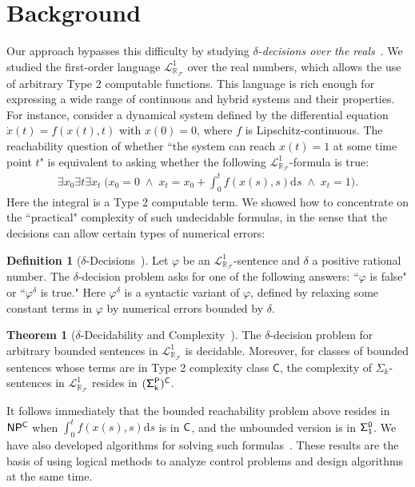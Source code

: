 \documentclass[10pt]{article}
\newcommand{\lrf}{\mathcal{L}_{\mathbb{R}_{\mathcal{F}}}}
\theoremstyle{definition}
\newtheorem{definition}{Definition}
\newtheorem{theorem}{Theorem}
\begin{document}
\section{Background}

Our approach bypasses this difficulty by studying {\em $\delta$-decisions over the reals}~\cite{DBLP:conf/lics/GaoAC12}. We studied the first-order language $\lrf^1$ over the real numbers, which allows the use of arbitrary Type 2 computable functions. This language is rich enough for expressing a wide range of continuous and hybrid systems and their properties. For instance, consider a dynamical system defined by the differential equation $\dot{x}(t) = f(x(t),t)$ with $x(0)= 0$, where $f$ is Lipschitz-continuous. The reachability question of whether ``the system can reach $x(t)=1$ at some time point $t$" is equivalent to asking whether the following $\mathcal{L}^1_{\mathbb{R}_{\mathcal{F}}}$-formula is true:
\begin{eqnarray*}\exists x_0 \exists t \exists x_t\; \bigg(x_0 = 0 \;\wedge\; x_t = x_0 + \int_{0}^t f(x(s),s)\mathrm{d}s\; \wedge\; x_t = 1\bigg).\end{eqnarray*}
Here the integral is a Type 2 computable term. We showed how to concentrate on the ``practical" complexity of such undecidable formulas, in the sense that the decisions can allow certain types of numerical errors:
\begin{definition}[$\delta$-Decisions~\cite{DBLP:conf/lics/GaoAC12}] Let $\varphi$ be an $\lrf^1$-sentence and $\delta$ a positive rational number. The $\delta$-decision problem asks for one of the following answers: ``$\varphi$ is false" or ``$\varphi^{\delta}$ is true." Here $\varphi^{\delta}$ is a syntactic variant of $\varphi$, defined by relaxing some constant terms in $\varphi$ by numerical errors bounded by $\delta$. 
\end{definition}
\begin{theorem}[$\delta$-Decidability and Complexity~\cite{DBLP:conf/lics/GaoAC12}] The $\delta$-decision problem for arbitrary bounded sentences in $\lrf^1$ is decidable. Moreover, for classes of bounded sentences whose terms are in Type 2 complexity class $\mathsf{C}$, the complexity of $\Sigma_k$-sentences in $\lrf^1$ resides in ${\sf (\Sigma^P_k)^C}$. 
\end{theorem}
It follows immediately that the bounded reachability problem above resides in ${\sf NP^C}$ when $\int_{0}^t f(x(s),s)\mathrm{d}s$ is in ${\sf C}$, and the unbounded version is in ${\sf \Sigma^0_1}$. We have also developed algorithms for solving such formulas~\cite{DBLP:conf/fmcad/GaoKC13}. These results are the basis of using logical methods to analyze control problems and design algorithms at the same time. 
\end{document}
